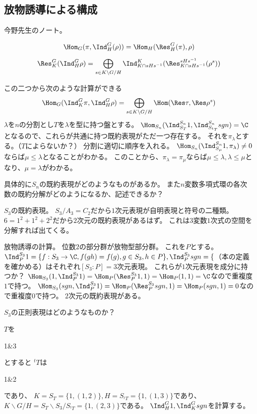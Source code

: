 \documentclass{jsarticle}
\begin{document}
\subsection{放物誘導による構成}
今野先生のノート。
\begin{thm}[Frobenius相互律]
\[
\Hom_G(\pi,\Ind^G_H(\rho))=\Hom_H(\Res^G_H(\pi),\rho)
\]
\end{thm}

\begin{thm}[Mackeyの公式]
\[
\Res^G_K(\Ind^G_H\rho)=\bigoplus_{s\in K\backslash G/H}\Ind^K_{K\cap sHs^{-1}}(\Res^{sHs^{-1}}_{K\cap sHs^{-1}}(\rho^s))
\]
\end{thm}

この二つから次のような計算ができる
\[
\Hom_G(\Ind^G_K\pi,\Ind^G_H\rho)=\bigoplus_{s\in K\backslash G/H}\Hom(\Res\tau,\Res\rho^s)
\]
$\lambda$を$n$の分割とし$T$を$\lambda$を型に持つ盤とする。
$\Hom_{S_n}(\Ind^{S_n}_{S_T}1,\Ind^{S_n}_{S_{{}^tT}}sgn)=\C$となるので、これらが共通に持つ既約表現がただ一つ存在する。
それを$\pi_\lambda$とする。（$T$によらないか？）
分割に適切に順序を入れる。
$\Hom_{S_n}(\Ind^{S_n}_{S_\mu}1,\pi_\lambda)\neq0$ならば$\mu\leq\lambda$となることがわかる。
このことから、$\pi_\lambda=\pi_\mu$ならば$\mu\leq\lambda,\lambda\leq\mu$となり、$\mu=\lambda$がわかる。

具体的に$S_n$の既約表現がどのようなものがあるか。
また$n$変数多項式環の各次数の既約分解がどのようになるか、記述できるか？

$S_3$の既約表現。
$S_3/A_3=C_2$だから$1$次元表現が自明表現と符号の二種類。
$6=1^2+1^2+2^2$だから$2$次元の既約表現があるはず。
これは$3$変数$1$次式の空間を分解すれば出てくる。

放物誘導の計算。
位数$2$の部分群が放物型部分群。
これを$P$とする。
$\Ind_{P}^{S_3}1=\{f:S_3\to\C,f(gh)=f(g), g\in S_3, h\in P\},
\Ind_P^{S_3}sgn=\{$（本の定義を確かめる）はそれぞれ$[S_3:P]=3$次元表現。
これらが$1$次元表現を成分に持つか？
$\Hom_{S_3}(1,\Ind^{S_3}_P1)=\Hom_P(\Res^{S_3}_P1,1)=\Hom_P(1,1)=\C$なので重複度$1$で持つ。
$\Hom_{S_3}(sgn,\Ind^{S_3}_P1)=\Hom_P(\Res^{S_3}_Psgn,1)=\Hom_P(sgn,1)=0$なので重複度$0$で持つ。
$2$次元の既約表現がある。

$S_3$の正則表現はどのようなものか？

$T$を
\begin{ytableau}
1&3\cr
\end{ytableau}
とすると
${}^tT$は
\begin{ytableau}
1&2\cr
\end{ytableau}
であり、
$K=S_T=\{1, (1,2)\}, H=S_{{}^tT}=\{1, (1,3)\}$であり、$K\backslash G/H=S_T\backslash S_3/S_{{}^tT}=\{1, (2,3)\}$である。
$\Ind^G_H1, \Ind^G_Ksgn$を計算する。
\end{document}
